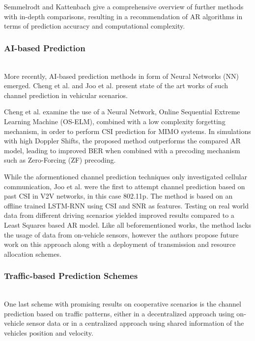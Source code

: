 \documentclass[conference]{IEEEtran}
\begin{document}
Semmelrodt and Kattenbach \cite{semmelrodtInvestigationDifferentFading2003} give a comprehensive overview of further methods with in-depth comparisons, resulting in a recommendation of AR algorithms in terms of prediction accuracy and computational complexity.
\\
\subsubsection{AI-based Prediction}\mbox{}\\
More recently, AI-based prediction methods in form of Neural Networks (NN) emerged. Cheng et al. \cite{chengLowComplexityChannel2020} and Joo et al. \cite{jooDeepLearningBasedChannel2019} present state of the art works of such channel prediction in vehicular scenarios. 

Cheng et al. examine the use of a Neural Network, Online Sequential Extreme Learning Machine (OS-ELM), combined with a low complexity forgetting mechanism, in order to perform CSI prediction for MIMO systems. In simulations with high Doppler Shifts, the proposed method outperforms the compared AR model, leading to improved BER when combined with a precoding mechanism such as Zero-Forcing (ZF) precoding.

While the aformentioned channel prediction techniques only investigated cellular communication, Joo et al. were the first to attempt channel prediction based on past CSI in V2V networks, in this case 802.11p. The method is based on an offline trained LSTM-RNN using CSI and SNR as features.
Testing on real world data from different driving scenarios yielded improved results compared to a Least Squares based AR model. Like all beforementioned works, the method lacks the usage of data from on-vehicle sensors, however the authors propose future work on this approach along with a deployment of transmission and resource allocation schemes.
\\
\subsubsection{Traffic-based Prediction Schemes}\mbox{}\\
One last scheme with promising results on cooperative scenarios is the channel prediction based on traffic patterns, either in a decentralized approach using on-vehicle sensor data or in a centralized approach using shared information of the vehicles position and velocity.
\end{document}
